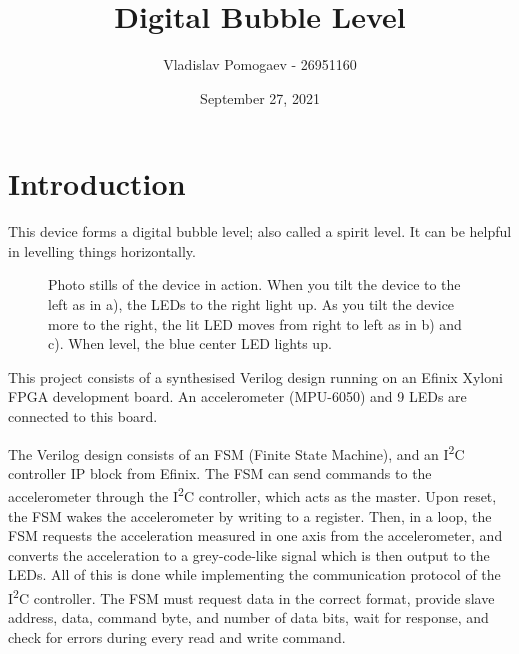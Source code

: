 \documentclass[11pt]{article}
\title{Digital Bubble Level}
\author{Vladislav Pomogaev - 26951160}
\date{September 27, 2021}
\begin{document}
\maketitle

\section{Introduction}
This device forms a digital bubble level; also called a spirit level. It can be helpful in levelling things horizontally.
\begin{figure}[H]
    \centering
    \caption{Photo stills of the device in action. When you tilt the device to the left as in a), the LEDs to the right light up. As you tilt the device more to the right, the lit LED moves from right to left as in b) and c). When level, the blue center LED lights up.}
    \label{fig:foobar}
\end{figure}

This project consists of a synthesised Verilog design running on an Efinix Xyloni FPGA development board. An accelerometer (MPU-6050) and 9 LEDs are connected to this board.

The Verilog design consists of an FSM (Finite State Machine), and an I\textsuperscript{2}C controller IP block from Efinix. The FSM can send commands to the accelerometer through the I\textsuperscript{2}C controller, which acts as the master. Upon reset, the FSM wakes the accelerometer by writing to a register. Then, in a loop, the FSM requests the acceleration measured in one axis from the accelerometer, and converts the acceleration to a grey-code-like signal which is then output to the LEDs. All of this is done while implementing the communication protocol of the I\textsuperscript{2}C controller. The FSM must request data in the correct format, provide slave address, data, command byte, and number of data bits, wait for response, and check for errors during every read and write command.
\end{document}
